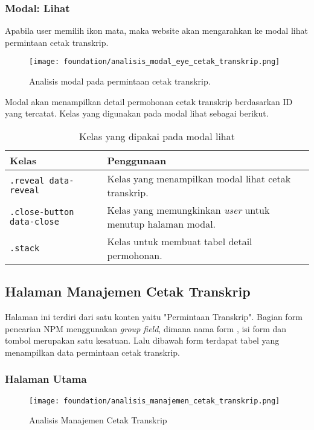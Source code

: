 \subsubsection{Modal: Lihat}
Apabila user memilih ikon mata, maka website akan mengarahkan ke modal lihat permintaan cetak transkrip. \\
\begin{figure} [H]
	\centering  
	\texttt{[image: foundation/analisis\_modal\_eye\_cetak\_transkrip.png]}  
	\caption{Analisis modal pada permintaan cetak transkrip.} 
\end{figure}

Modal akan menampilkan detail permohonan cetak transkrip berdasarkan ID yang tercatat. Kelas yang digunakan pada modal lihat sebagai berikut. \\

\begin{table}[H]
	\centering
	\begin{tabularx}{\textwidth}{lX}
		\toprule
		Kelas & Penggunaan \\
		\midrule
		\texttt{.reveal data-reveal} & Kelas yang menampilkan modal lihat cetak transkrip. \\
		\texttt{.close-button data-close} & Kelas yang memungkinkan \textit{user} untuk menutup halaman modal.\\
		\texttt{.stack} & Kelas untuk membuat tabel detail permohonan.\\
		\bottomrule
	\end{tabularx}%
	\caption{Kelas yang dipakai pada modal lihat}
\end{table}%

\subsection{Halaman Manajemen Cetak Transkrip}
Halaman ini terdiri dari satu konten yaitu "Permintaan Transkrip". Bagian form pencarian NPM menggunakan \textit{group field}, dimana nama form , isi form dan tombol merupakan satu kesatuan. Lalu dibawah form terdapat tabel yang menampilkan data permintaan cetak transkrip. 
\subsubsection{Halaman Utama}
\begin{figure} [H]
	\centering  
	\texttt{[image: foundation/analisis\_manajemen\_cetak\_transkrip.png]}
	\caption{Analisis Manajemen Cetak Transkrip} 
\end{figure} 

